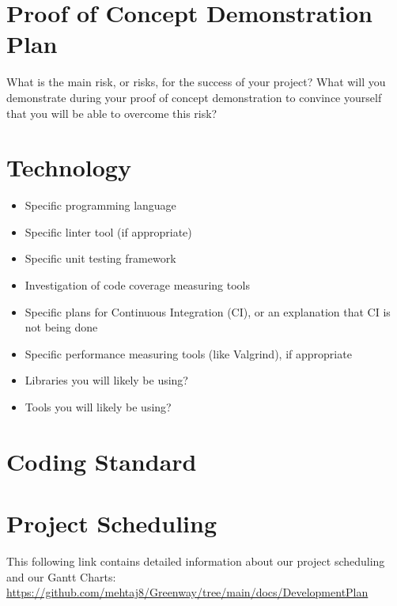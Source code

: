 \documentclass{article}
\begin{document}
\section{Proof of Concept Demonstration Plan}

What is the main risk, or risks, for the success of your project?  What will you
demonstrate during your proof of concept demonstration to convince yourself that
you will be able to overcome this risk?

\section{Technology}

\begin{itemize}
\item Specific programming language
\item Specific linter tool (if appropriate)
\item Specific unit testing framework
\item Investigation of code coverage measuring tools
\item Specific plans for Continuous Integration (CI), or an explanation that CI
  is not being done
\item Specific performance measuring tools (like Valgrind), if
  appropriate
\item Libraries you will likely be using?
\item Tools you will likely be using?
\end{itemize}

\section{Coding Standard}

\section{Project Scheduling}
This following link contains detailed information about our project scheduling and our Gantt Charts:\\
\url{https://github.com/mehtaj8/Greenway/tree/main/docs/DevelopmentPlan}
\end{document}
